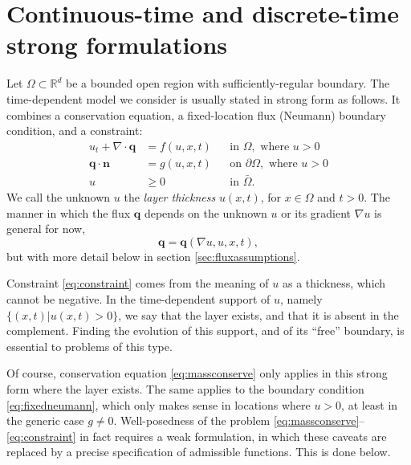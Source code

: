 \documentclass[final,leqno,onefignum,onetabnum]{siamltex1213bueler}
\newcommand\bn{\mathbf{n}}
\newcommand\bq{\mathbf{q}}
\newcommand{\Div}{\nabla\cdot}
\renewcommand{\grad}{\nabla}
\newcommand\RR{\mathbb{R}}
\begin{document}
\section{Continuous-time and discrete-time strong formulations}  \label{sec:strongform}

Let $\Omega \subset \RR^d$ be a bounded open region with sufficiently-regular boundary.  The time-dependent model we consider is usually stated in strong form as follows.  It combines a conservation equation, a fixed-location flux (Neumann) boundary condition, and a constraint:
\begin{align}
u_t + \Div \bq &= f(u,x,t) &&\text{in } \Omega, \text{ where } u > 0 \label{eq:massconserve} \\
\bq \cdot \bn &= g(u,x,t) &&\text{on } \partial\Omega, \text{ where } u > 0 \label{eq:fixedneumann} \\
u &\ge 0 &&\text{in } \bar\Omega. \label{eq:constraint}
\end{align}
We call the unknown $u$ the \emph{layer thickness} $u(x,t)$, for $x\in \Omega$ and $t>0$.  The manner in which the flux $\bq$ depends on the unknown $u$ or its gradient $\grad u$ is general for now,
\begin{equation}
\bq = \bq(\grad u,u,x,t), \label{eq:fluxdepends}
\end{equation}
but with more detail below in section \ref{sec:fluxassumptions}.

Constraint \eqref{eq:constraint} comes from the meaning of $u$ as a thickness, which cannot be negative.  In the time-dependent support of $u$, namely $\{(x,t) \big| u(x,t) > 0\}$, we say that the layer exists, and that it is absent in the complement.  Finding the evolution of this support, and of its ``free'' boundary, is essential to problems of this type.

Of course, conservation equation \eqref{eq:massconserve} only applies in this strong form where the layer exists.  The same applies to the boundary condition \eqref{eq:fixedneumann}, which only makes sense in locations where $u>0$, at least in the generic case $g\ne 0$.  Well-posedness of the problem \eqref{eq:massconserve}--\eqref{eq:constraint} in fact requires a weak formulation, in which these caveats are replaced by a precise specification of admissible functions.  This is done below.
\end{document}
